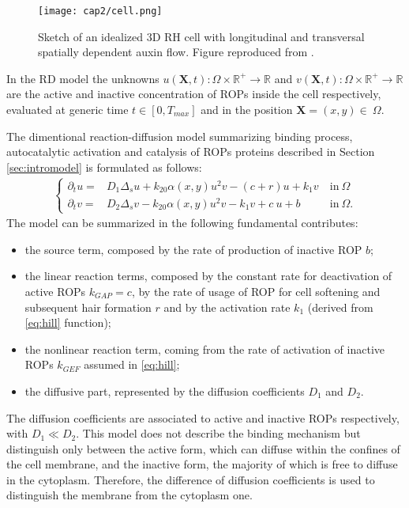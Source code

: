 \begin{figure}
    \centering
    \texttt{[image: cap2/cell.png]}
    \caption{Sketch of an idealized 3D RH cell with longitudinal and transversal spatially dependent auxin flow. Figure reproduced from \cite{intra1_R}.}
    \label{fig:cell}
\end{figure}
In the RD model the unknowns $u\left(\mathbf{X}, t\right) : \Omega \times \mathds{R}^+ \longrightarrow \mathds{R} $  and $v\left(\mathbf{X}, t\right): \Omega \times \mathds{R}^+ \longrightarrow \mathds{R} $ are the active and inactive concentration of ROPs inside the cell respectively, evaluated at generic time $t \in \left[ 0, T_{max}\right]$ and in the position $\mathbf{X} = \left(x,y \right) \in \ \Omega$.

The dimentional reaction-diffusion model summarizing binding process, autocatalytic activation and catalysis of ROPs proteins described in Section \ref{sec:intromodel} is formulated as follows:
\begin{equation} \label{eq:FM}\begin{aligned}
\left\lbrace
\begin{matrix}
\partial_t u = & D_1 \Delta_s u + k_{20} \alpha(x,y)u^2 v - \left(c+r\right) u + k_1 v  & \ \text{in} \ \Omega\\
    \partial_t v = & D_2 \Delta_s v - k_{20} \alpha(x,y) u^2 v - k_1 v + c \ u + b   & \ \text{in} \ \Omega.
\end{matrix}
\right.
\end{aligned}\end{equation}
The model can be summarized in the following fundamental contributes:
\begin{itemize}
  \item the source term, composed by the rate of production of inactive ROP $b$;
  \item the linear reaction terms, composed by the constant rate for deactivation of active ROPs $k_{GAP} = c$, by the rate of usage of ROP for cell softening and subsequent hair formation $r$ and by the activation rate $k_1$ (derived from \eqref{eq:hill} function);
  \item the nonlinear reaction term, coming from the rate of activation of inactive ROPs $k_{GEF}$ assumed in \eqref{eq:hill};
  \item the diffusive part, represented by the diffusion coefficients $D_1$ and $D_2$.
\end{itemize}
The diffusion coefficients are associated to active and inactive ROPs respectively, with $D_1 \ll D_2$. This model does not describe the binding mechanism but distinguish only between the active form, which can diffuse within the confines of the cell membrane, and the inactive form, the majority of which is free to diffuse in the cytoplasm. Therefore, the difference of diffusion coefficients is used to distinguish the membrane from the cytoplasm one.

